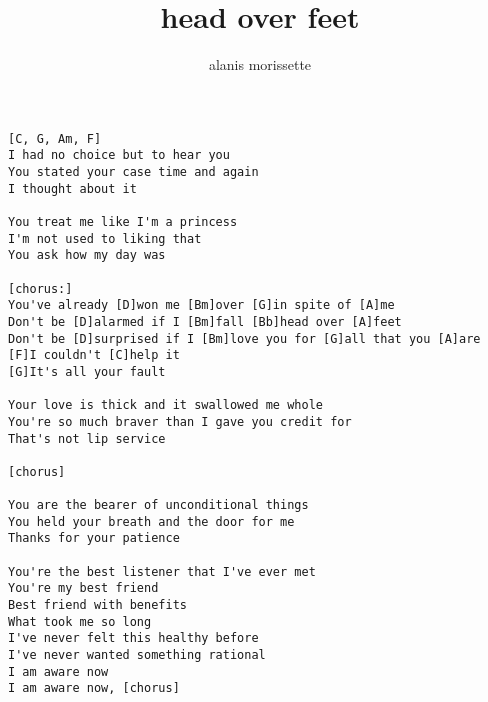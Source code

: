 \author{alanis morissette}
\title{head over feet}
\maketitle
\begin{verbatim}
[C, G, Am, F]
I had no choice but to hear you
You stated your case time and again
I thought about it

You treat me like I'm a princess
I'm not used to liking that
You ask how my day was

[chorus:]
You've already [D]won me [Bm]over [G]in spite of [A]me
Don't be [D]alarmed if I [Bm]fall [Bb]head over [A]feet
Don't be [D]surprised if I [Bm]love you for [G]all that you [A]are
[F]I couldn't [C]help it
[G]It's all your fault

Your love is thick and it swallowed me whole
You're so much braver than I gave you credit for
That's not lip service

[chorus]

You are the bearer of unconditional things
You held your breath and the door for me
Thanks for your patience

You're the best listener that I've ever met
You're my best friend
Best friend with benefits
What took me so long
I've never felt this healthy before
I've never wanted something rational
I am aware now
I am aware now, [chorus]
\end{verbatim}